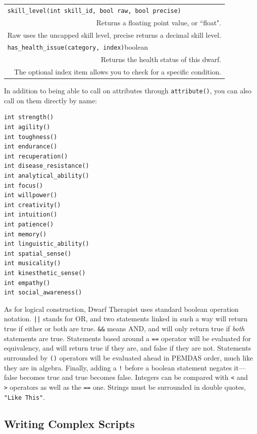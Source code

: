 \documentclass[]{article}
\begin{document}
\begin{tabular}{l c l}
\multicolumn{3}{l}{\texttt{skill\_level(int skill\_id, bool raw, bool precise)}}\\
\multicolumn{3}{r}{Returns a floating point value, or ``float".}\\
\multicolumn{3}{r}{Raw uses the uncapped skill level, precise returns a decimal skill level.}\\
\multicolumn{3}{l}{\texttt{has\_health\_issue(category, index)}\quad boolean}\\
\multicolumn{3}{r}{Returns the health status of this dwarf.}\\
\multicolumn{3}{r}{The optional index item allows you to check for a specific condition.}\\
\end{tabular}
\vspace{12pt}

\noindent In addition to being able to call on attributes through \texttt{attribute()}, you can also call
on them directly by name:
\begin{multicols}{3}

\begin{verbatim}
int strength()
int agility()
int toughness()
int endurance()
int recuperation()
int disease_resistance()
int analytical_ability()
int focus()
int willpower()
int creativity()
int intuition()
int patience()
int memory()
int linguistic_ability()
int spatial_sense()
int musicality()
int kinesthetic_sense()
int empathy()
int social_awareness()
\end{verbatim}
\end{multicols}

As for logical construction, Dwarf Therapist uses standard boolean operation notation. \texttt{||} stands
for OR, and two statements linked in such a way will return true if either or both are true.
\texttt{\&\&} means AND, and will only return true if \emph{both} statements are true. Statements based
around a \texttt{==} operator will be evaluated for equivalency, and will return true if they are, and
false if they are not. Statements surrounded by \texttt{()} operators will be evaluated ahead in PEMDAS
order, much like they are in algebra. Finally, adding a \texttt{!} before a boolean statement negates
it---false becomes true and true becomes false. Integers can be compared with \texttt{<} and \texttt{>}
operators as well as the \texttt{==} one. Strings must be surrounded in double quotes, \texttt{"Like
This"}.

\subsection{Writing Complex Scripts}
\label{sec:Writing Complex Scripts}
\end{document}
